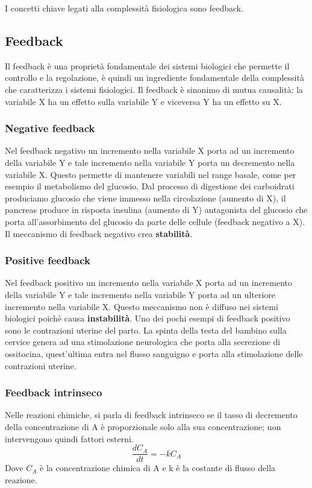 I concetti chiave legati alla complessità fisiologica sono feedback.

\subsection{Feedback}
Il feedback è una proprietà fondamentale dei sistemi biologici che permette il controllo e la regolazione, è quindi un ingrediente fondamentale della complessità che caratterizza i sistemi fisiologici. Il feedback è sinonimo di mutua causalità: la variabile X ha un effetto sulla variabile Y e viceversa Y ha un effetto su X. 
\subsubsection{Negative feedback}
Nel feedback negativo un incremento nella variabile X porta ad un incremento della variabile Y e tale incremento nella variabile Y porta un decremento nella variabile X. Questo permette di mantenere variabili nel range basale, come per esempio il metabolismo del glucosio. Dal processo di digestione dei carboidrati produciamo glucosio che viene immesso nella circolazione (aumento di X), il pancreas produce in risposta insulina (aumento di Y) antagonista del glucosio che porta all'assorbimento del glucosio da parte delle cellule (feedback negativo a X). Il meccanismo di feedback negativo crea \textbf{stabilità}.


\subsubsection{Positive feedback}
Nel feedback positivo un incremento nella variabile X porta ad un incremento della variabile Y e tale incremento nella variabile Y porta ad un ulteriore incremento nella variabile X. Questo meccanismo non è diffuso nei sistemi biologici poichè causa \textbf{instabilità}. Uno dei pochi esempi di feedback positivo sono le contrazioni uterine del parto. La spinta della testa del bambino sulla cervice genera ad una stimolazione neurologica che porta alla secrezione di ossitocina, quest'ultima entra nel flusso sanguigno e porta alla stimolazione delle contrazioni uterine. 

\subsubsection{Feedback intrinseco}
Nelle reazioni chimiche, si parla di feedback intrinseco se il tasso di decremento della concentrazione di A è proporzionale solo alla sua concentrazione; non intervengono quindi fattori esterni. 
\begin{equation}
    \frac{dC_A}{dt}=-kC_A
\end{equation}
Dove $C_A$ è la concentrazione chimica di A e k è la costante di flusso della reazione. 


